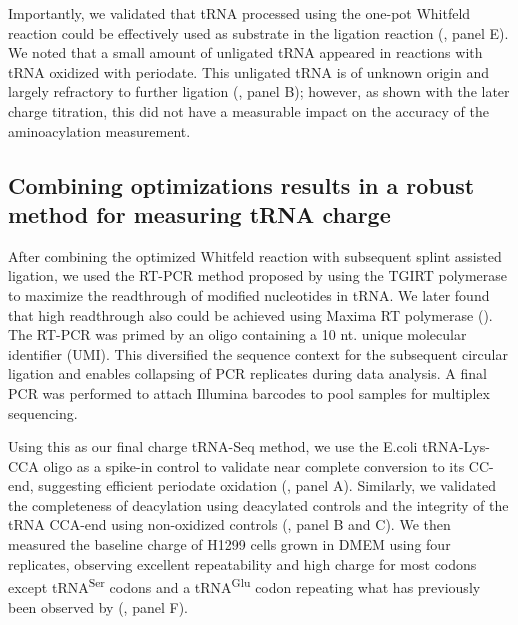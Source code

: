 \documentclass[9pt,lineno]{elife}
\begin{document}
Importantly, we validated that tRNA processed using the one-pot Whitfeld reaction could be effectively used as substrate in the ligation reaction (, panel E).
We noted that a small amount of unligated tRNA appeared in reactions with tRNA oxidized with periodate.
This unligated tRNA is of unknown origin and largely refractory to further ligation (, panel B); however, as shown with the later charge titration, this did not have a measurable impact on the accuracy of the aminoacylation measurement.



\subsection{Combining optimizations results in a robust method for measuring tRNA charge}
After combining the optimized Whitfeld reaction with subsequent splint assisted ligation, we used the RT-PCR method proposed by \cite{Behrens2021-gb} using the TGIRT polymerase \citep{Mohr2013-hu} to maximize the readthrough of modified nucleotides in tRNA.
We later found that high readthrough also could be achieved using Maxima RT polymerase ().
The RT-PCR was primed by an oligo containing a 10 nt. unique molecular identifier (UMI).
This diversified the sequence context for the subsequent circular ligation and enables collapsing of PCR replicates during data analysis.
A final PCR was performed to attach Illumina barcodes to pool samples for multiplex sequencing.

Using this as our final charge tRNA-Seq method, we use the E.coli tRNA-Lys-CCA oligo as a spike-in control to validate near complete conversion to its CC-end, suggesting efficient periodate oxidation (, panel A).
Similarly, we validated the completeness of deacylation using deacylated controls and the integrity of the tRNA CCA-end using non-oxidized controls (, panel B and C).
We then measured the baseline charge of H1299 cells grown in DMEM using four replicates, observing excellent repeatability and high charge for most codons except tRNA\textsuperscript{Ser} codons and a tRNA\textsuperscript{Glu} codon repeating what has previously been observed by \cite{Evans2017-st} (, panel F).
\end{document}
